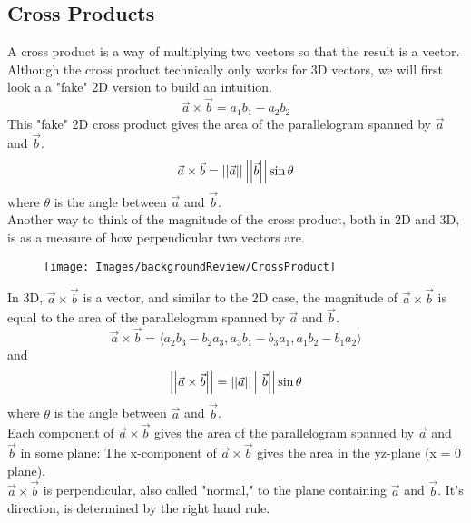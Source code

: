 \subsection{Cross Products}
\noindent
A cross product is a way of multiplying two vectors so that the result is a vector. Although the cross product technically only works for 3D vectors, we will first look a a "fake" 2D version to build an intuition.
\begin{equation*}
	\vec{a}\times\vec{b} = a_1b_1-a_2b_2
\end{equation*}
This "fake" 2D cross product gives the area of the parallelogram spanned by $\vec{a}$ and $\vec{b}$.
\begin{equation*}
	\vec{a}\times\vec{b} = \left|\left|\vec{a}\right|\right|\left|\left|\vec{b}\right|\right|\sin{\theta}	
\end{equation*}
where $\theta$ is the angle between $\vec{a}$ and $\vec{b}$.\\
Another way to think of the magnitude of the cross product, both in 2D and 3D, is as a measure of how perpendicular two vectors are.

\begin{figure}[h]
	\centering
	\texttt{[image: Images/backgroundReview/CrossProduct]}
\end{figure}

\noindent
In 3D, $\vec{a}\times\vec{b}$ is a vector, and similar to the 2D case, the magnitude of $\vec{a}\times\vec{b}$ is equal to the area of the parallelogram spanned by $\vec{a}$ and $\vec{b}$.
\begin{equation*}
	\vec{a}\times\vec{b} = \langle a_2b_3-b_2a_3,a_3b_1-b_3a_1,a_1b_2-b_1a_2 \rangle
\end{equation*}
and
\begin{equation*}
	\left|\left|\vec{a}\times\vec{b}\right|\right|=\left|\left|\vec{a}\right|\right|\left|\left|\vec{b}\right|\right|\sin{\theta}
\end{equation*}
where $\theta$ is the angle between $\vec{a}$ and $\vec{b}$.\\
Each component of $\vec{a}\times\vec{b}$ gives the area of the parallelogram spanned by $\vec{a}$ and $\vec{b}$ in some plane: The x-component of $\vec{a}\times\vec{b}$ gives the area in the yz-plane (x = 0 plane).\\
$\vec{a}\times\vec{b}$ is perpendicular, also called "normal," to the plane containing $\vec{a}$ and $\vec{b}$. It's direction, is determined by the right hand rule.\\

